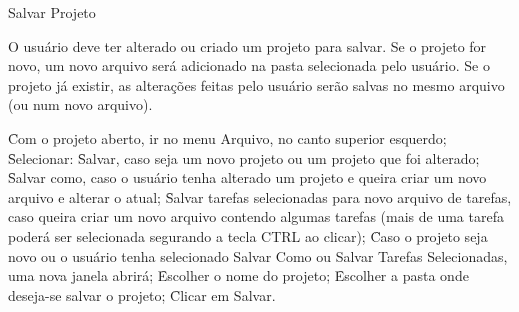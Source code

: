 \begin{funcionalidade}{Salvar Projeto}



	\condicao
	{O usuário deve ter alterado ou criado um projeto para salvar.} %
	{Se o projeto for novo, um novo arquivo será adicionado na pasta selecionada pelo usuário. Se o projeto já existir, as alterações feitas pelo usuário serão salvas no mesmo arquivo (ou num novo arquivo).} %

	\begin{fluxo}
		\f Com o projeto aberto, ir no menu Arquivo, no canto superior esquerdo;
		\f Selecionar:
			\subf
			\f Salvar, caso seja um novo projeto ou um projeto que foi alterado;
			\f Salvar como, caso o usuário tenha alterado um projeto e queira criar um novo arquivo e alterar o atual;
			\f Salvar tarefas selecionadas para novo arquivo de tarefas, caso queira criar um novo arquivo contendo algumas tarefas (mais de uma tarefa poderá ser selecionada segurando a tecla CTRL ao clicar);
			\voltaf
		\f Caso o projeto seja novo ou o usuário tenha selecionado Salvar Como ou Salvar Tarefas Selecionadas, uma nova janela abrirá;
		\f Escolher o nome do projeto;
		\f Escolher a pasta onde deseja-se salvar o projeto;
		\f Clicar em Salvar.
	\end{fluxo}


\end{funcionalidade}



